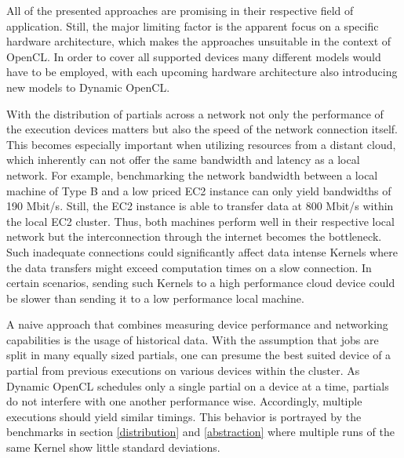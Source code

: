 All of the presented approaches are promising in their respective field of application. Still, the major limiting factor is the apparent focus on a specific hardware architecture, which makes the approaches unsuitable in the context of OpenCL. In order to cover all supported devices many different models would have to be employed, with each upcoming hardware architecture also introducing new models to Dynamic OpenCL.

With the distribution of partials across a network not only the performance of the execution devices matters but also the speed of the network connection itself. This becomes especially important when utilizing resources from a distant cloud, which inherently can not offer the same bandwidth and latency as a local network. For example, benchmarking the network bandwidth between a local machine of Type B and a low priced EC2 instance can only yield bandwidths of 190 Mbit/s. Still, the EC2 instance is able to transfer data at 800 Mbit/s within the local EC2 cluster. Thus, both machines perform well in their respective local network but the interconnection through the internet becomes the bottleneck. Such inadequate connections could significantly affect data intense Kernels where the data transfers might exceed computation times on a slow connection. In certain scenarios, sending such Kernels to a high performance cloud device could be slower than sending it to a low performance local machine.

A naive approach that combines measuring device performance and networking capabilities is the usage of historical data. With the assumption that jobs are split in many equally sized partials, one can presume the best suited device of a partial from previous executions on various devices within the cluster. As Dynamic OpenCL schedules only a single partial on a device at a time, partials do not interfere with one another performance wise. Accordingly, multiple executions should yield similar timings. This behavior is portrayed by the benchmarks in section \ref{distribution} and \ref{abstraction} where multiple runs of the same Kernel show little standard deviations.


